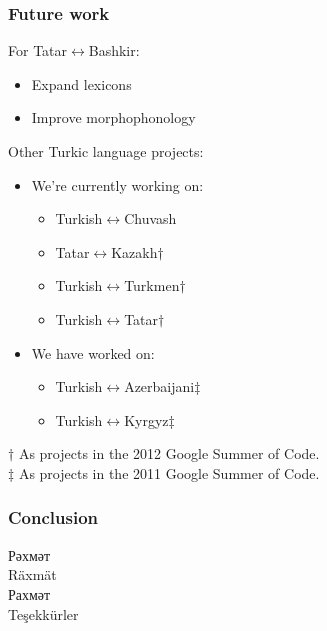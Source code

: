 \documentclass[10pt,xetex]{beamer} %
\begin{document}
\begin{frame}
  \frametitle{Future work}

\begin{block}{For Tatar$\leftrightarrow$Bashkir:}
  \begin{itemize}
    \item Expand lexicons 
    \item Improve morphophonology
  \end{itemize}
\end{block}

\begin{block}{Other Turkic language projects:}
  \begin{itemize}
    \item We're currently working on:

    \begin{itemize}
      \item Turkish$\leftrightarrow$Chuvash
      \item Tatar$\leftrightarrow$Kazakh$\dag$
      \item Turkish$\leftrightarrow$Turkmen$\dag$
      \item Turkish$\leftrightarrow$Tatar$\dag$
    \end{itemize}

    \item We have worked on: 
    \begin{itemize}
      \item Turkish$\leftrightarrow$Azerbaijani$\ddag$
      \item Turkish$\leftrightarrow$Kyrgyz$\ddag$
    \end{itemize}
  \end{itemize}
  $\dag$ As projects in the 2012 Google Summer of Code. \\
  $\ddag$ As projects in the 2011 Google Summer of Code.
\end{block}

\end{frame}

\begin{frame}
  \frametitle{Conclusion}

\begin{block}


\end{block}

\end{frame}

\begin{frame}

\begin{Large}
\begin{center}
Рәхмәт \\ 
Räxmät \\
Рахмәт \\ 
Teşekkürler\\
~\\
\smiley
\end{center}
\end{Large}
\end{frame}
\end{document}
